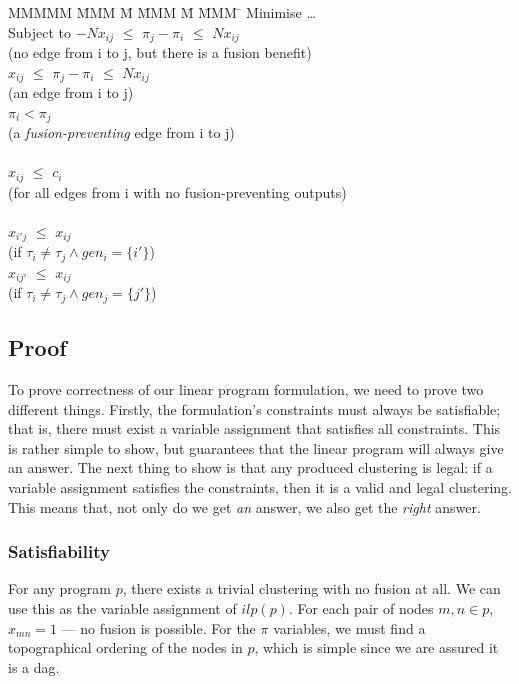 \begin{tabbing}
MMMMM   \= MMM \= M \= MMM \= M \= MMM \= \kill
Minimise   \> \ldots \\
Subject to \> $-N x_{ij}$ \> $\le$ \> $\pi_j - \pi_i$ \> $\le$ \> $N x_{ij}$ \\
           \>             (no edge from i to j, but there is a fusion benefit)            \\
           \>    $x_{ij}$ \> $\le$ \> $\pi_j - \pi_i$ \> $\le$ \> $N x_{ij}$ \\
           \>             (an edge from i to j)            \\
           \>             \>       \> $\pi_i < \pi_j$ \>       \>            \\
           \>             (a \emph{fusion-preventing} edge from i to j)            \\
\\
           \> $x_{ij}$    \> $\le$ \> $c_i$           \>       \>            \\
           \> (for all edges from i with no fusion-preventing outputs)      \\
\\
           \> $x_{i'j}$   \> $\le$ \> $x_{ij}$        \>       \>            \\
           \> (if $\tau_i \not= \tau_j \wedge gen_i=\{i'\}$) \\
           \> $x_{ij'}$   \> $\le$ \> $x_{ij}$        \>       \>            \\
           \> (if $\tau_i \not= \tau_j \wedge gen_j=\{j'\}$) \\
\end{tabbing}


\subsection{Proof}
To prove correctness of our linear program formulation, we need to prove two different things.
Firstly, the formulation's constraints must always be satisfiable; that is, there must exist a variable assignment that satisfies all constraints.
This is rather simple to show, but guarantees that the linear program will always give an answer.
The next thing to show is that any produced clustering is legal: if a variable assignment satisfies the constraints, then it is a valid and legal clustering.
This means that, not only do we get \emph{an} answer, we also get the \emph{right} answer.

\subsubsection{Satisfiability}
For any program $p$, there exists a trivial clustering with no fusion at all.
We can use this as the variable assignment of $ilp(p)$.
For each pair of nodes $m,n \in p$, $x_{mn} = 1$ --- no fusion is possible.
For the $\pi$ variables, we must find a topographical ordering of the nodes in $p$, which is simple since we are assured it is a dag.

